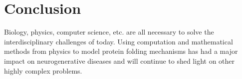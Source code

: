 \documentclass[12pt]{article}
\begin{document}
\section{Conclusion}
    Biology, physics, computer science, etc. are all necessary to solve the interdisciplinary challenges of today. Using computation and mathematical methods from physics to model protein folding mechanisms has had a major impact on neurogenerative diseases and will continue to shed light on other highly complex problems. 
\end{document}
